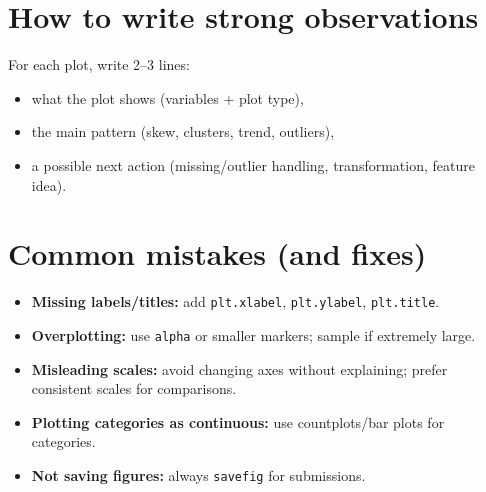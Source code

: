 \documentclass[11pt]{article}
\begin{document}
\section{How to write strong observations}
For each plot, write 2--3 lines:
\begin{itemize}[leftmargin=*]
  \item what the plot shows (variables + plot type),
  \item the main pattern (skew, clusters, trend, outliers),
  \item a possible next action (missing/outlier handling, transformation, feature idea).
\end{itemize}

\section{Common mistakes (and fixes)}
\begin{itemize}[leftmargin=*]
  \item \textbf{Missing labels/titles:} add \texttt{plt.xlabel}, \texttt{plt.ylabel}, \texttt{plt.title}.
  \item \textbf{Overplotting:} use \texttt{alpha} or smaller markers; sample if extremely large.
  \item \textbf{Misleading scales:} avoid changing axes without explaining; prefer consistent scales for comparisons.
  \item \textbf{Plotting categories as continuous:} use countplots/bar plots for categories.
  \item \textbf{Not saving figures:} always \texttt{savefig} for submissions.
\end{itemize}

\notesources{\AIMLLabSources}
\end{document}
